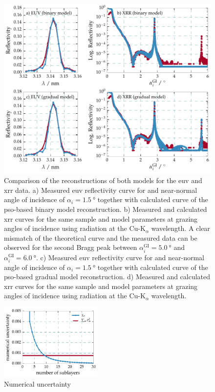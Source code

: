 \begin{figure}[htbp]
  \centering
  \includegraphics[width=\textwidth]{img/CrSc_bianry_vs_gradual_model_fits}
  \caption{Comparison of the reconstructions of both models for the \gls{euv} and \gls{xrr} data. a) Measured \gls{euv} reflectivity curve for and near-normal angle of incidence of $\alpha_i=\SI{1.5}{\degree}$ together with calculated curve of the \gls{pso}-based binary model reconstruction. b) Measured and calculated \gls{xrr} curves for the same sample and model parameters at grazing angles of incidence using radiation at the Cu-K$_\alpha$ wavelength. A clear mismatch of the theoretical curve and the measured data can be observed for the second Bragg peak between $\alpha_i^\text{GI} = \SI{5.0}{\degree}$ and $\alpha_i^\text{GI} = \SI{6.0}{\degree}$.
  c) Measured \gls{euv} reflectivity curve for and near-normal angle of incidence of $\alpha_i=\SI{1.5}{\degree}$ together with calculated curve of the \gls{pso}-based gradual model reconstruction. d) Measured and calculated \gls{xrr} curves for the same sample and model parameters at grazing angles of incidence using radiation at the Cu-K$_\alpha$ wavelength.}
  \label{ch_spec:fig_CrSc_bianry_vs_gradual_model_fits}
\end{figure}
\begin{figure}[htbp]
  \centering
  \includegraphics[width=0.45\textwidth]{img/CrSc_numerical_uncertainty_mixlayer}
  \caption{Numerical uncertainty}
  \label{ch_spec:fig_CrSc_numerical_uncertainty_mixlayer}
\end{figure}


